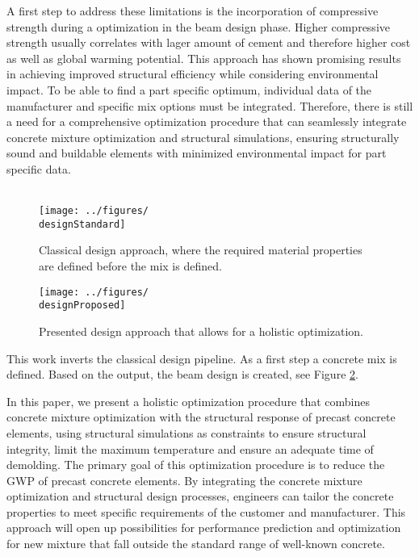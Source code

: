 A first step to address these limitations is the incorporation of compressive strength during a optimization in the beam design phase.
Higher compressive strength usually correlates with lager amount of cement and therefore higher cost as well as global warming potential.
This approach has shown promising results in achieving improved structural efficiency while considering environmental impact.
To be able to find a part specific optimum, individual data of the manufacturer and specific mix options must be integrated.
Therefore, there is still a need for a comprehensive optimization procedure that can seamlessly integrate concrete mixture optimization and structural simulations, ensuring structurally sound and buildable elements with minimized environmental impact for part specific data.
\\\\
\begin{figure}[ht]%
	\centering
	\texttt{[image: ../figures/\\designStandard]}
	\caption{Classical design approach, where the required material properties are defined before the mix is defined.}\label{fig:standard_design}
\end{figure}
\begin{figure}[ht]%
	\centering
	\texttt{[image: ../figures/\\designProposed]}
	\caption{Presented design approach that allows for a holistic optimization.}\label{fig:proposed_workflow}
\end{figure}
This work inverts the classical design pipeline.
As a first step a concrete mix is defined. 
Based on the output, the beam design is created, see Figure \ref{fig:proposed_workflow}.

In this paper, we present a holistic optimization procedure that combines concrete mixture optimization with the structural response of precast concrete elements, using structural simulations as constraints to ensure structural integrity, limit the maximum temperature and ensure an adequate time of demolding.
The primary goal of this optimization procedure is to reduce the GWP of precast concrete elements. 
By integrating the concrete mixture optimization and structural design processes, engineers can tailor the concrete properties to meet specific requirements of the customer and manufacturer.
This approach will open up possibilities for performance prediction and optimization for new mixture that fall outside the standard range of well-known concrete.




